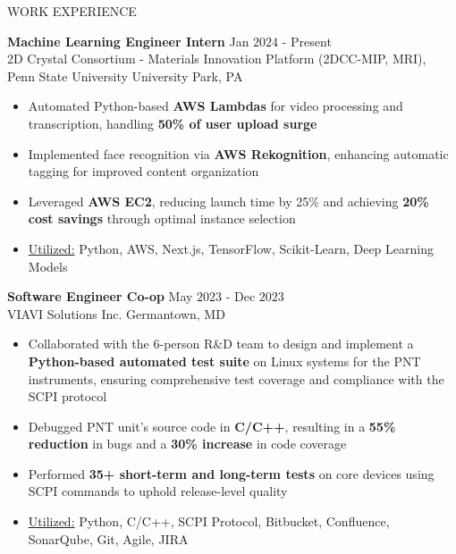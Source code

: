\documentclass{resume} %
\begin{document}
\begin{rSection}{WORK EXPERIENCE}

{\bf Machine Learning Engineer Intern} \hfill Jan $2024$ - Present\\
2D Crystal Consortium - Materials Innovation Platform (2DCC-MIP, MRI), Penn State University \hfill University Park, PA
\begin{itemize}[itemsep = -4pt]
    \item Automated Python-based {\bf AWS Lambdas} for video processing and transcription, handling {\bf 50\% of user upload surge}
    \item Implemented face recognition via {\bf AWS Rekognition}, enhancing automatic tagging for improved content organization
    \item Leveraged {\bf AWS EC2}, reducing launch time by 25\% and achieving {\bf 20\% cost savings} through optimal instance selection
    \item \underline{Utilized:} Python, AWS, Next.js, TensorFlow, Scikit-Learn, Deep Learning Models 
\end{itemize}

{\bf Software Engineer Co-op} \hfill May $2023$ - Dec $2023$\\
VIAVI Solutions Inc. \hfill Germantown, MD
\begin{itemize}[itemsep = -4pt]
    \item Collaborated with the $6$-person R\&D team to design and implement a {\bf Python-based automated test suite} on Linux systems for the PNT instruments, ensuring comprehensive test coverage and compliance with the SCPI protocol
    \item Debugged PNT unit's source code in {\bf C/C++}, resulting in a {\bf 55\% reduction} in bugs and a {\bf 30\% increase} in code coverage
    \item Performed {\bf 35+ short-term and long-term tests} on core devices using SCPI commands to uphold release-level quality
    \item \underline{Utilized:} Python, C/C++, SCPI Protocol, Bitbucket, Confluence, SonarQube, Git, Agile, JIRA
\end{itemize}


\end{rSection}
\end{document}
